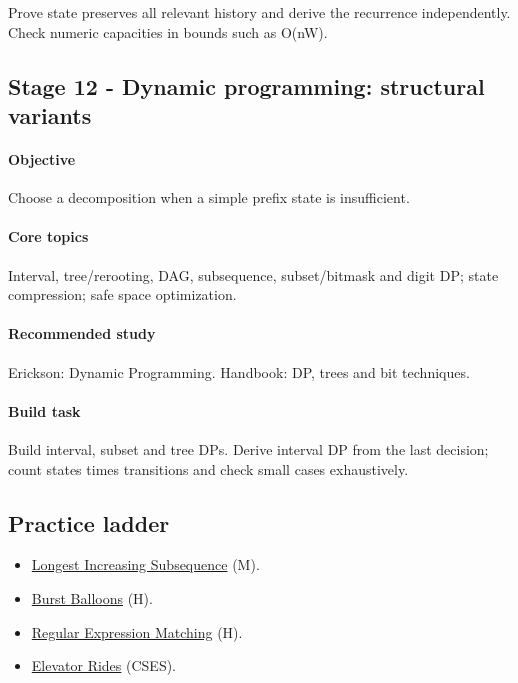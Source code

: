 \documentclass[11pt,letterpaper]{article}
\begin{document}
Prove state preserves all relevant history and derive the recurrence independently. Check numeric capacities in bounds such as O(nW).

\par{}
\begin{samepage}
\section{Stage 12 - Dynamic programming: structural variants}\label{sec:16}

\label{stage:12}


\paragraph*{Objective}

Choose a decomposition when a simple prefix state is insufficient.

\end{samepage}

\paragraph*{Core topics}

Interval, tree/rerooting, DAG, subsequence, subset/bitmask and digit DP; state compression; safe space optimization.

\paragraph*{Recommended study}

Erickson: Dynamic Programming. Handbook: DP, trees and bit techniques.

\paragraph*{Build task}

Build interval, subset and tree DPs. Derive interval DP from the last decision; count states times transitions and check small cases exhaustively.

\subsection*{Practice ladder}

\begin{itemize}

\item \href{https://leetcode.com/problems/longest-increasing-subsequence/}{Longest Increasing Subsequence} (M).

\item \href{https://leetcode.com/problems/burst-balloons/}{Burst Balloons} (H).

\item \href{https://leetcode.com/problems/regular-expression-matching/}{Regular Expression Matching} (H).

\item \href{https://cses.fi/problemset/task/1653}{Elevator Rides} (CSES).

\end{itemize}
\end{document}
